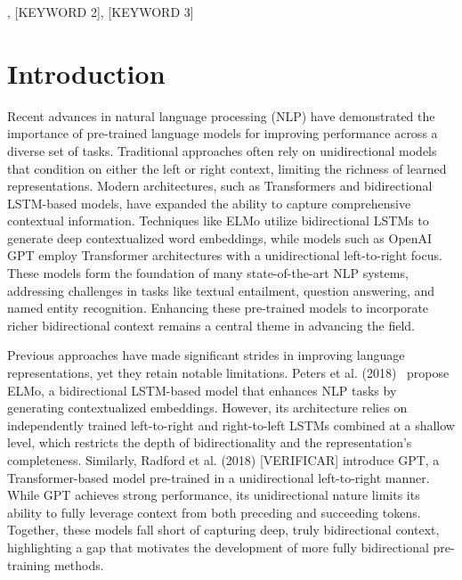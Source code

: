 \documentclass[journal]{IEEEtran}
\begin{document}
\begin{IEEEkeywords}
[KEYWORD 1], [KEYWORD 2], [KEYWORD 3]
\end{IEEEkeywords}

\IEEEpeerreviewmaketitle


\section{Introduction}

Recent advances in natural language processing (NLP) have demonstrated the importance of pre-trained language models for improving performance across a diverse set of tasks. Traditional approaches often rely on unidirectional models that condition on either the left or right context, limiting the richness of learned representations. Modern architectures, such as Transformers and bidirectional LSTM-based models, have expanded the ability to capture comprehensive contextual information. Techniques like ELMo utilize bidirectional LSTMs to generate deep contextualized word embeddings, while models such as OpenAI GPT employ Transformer architectures with a unidirectional left-to-right focus. These models form the foundation of many state-of-the-art NLP systems, addressing challenges in tasks like textual entailment, question answering, and named entity recognition. Enhancing these pre-trained models to incorporate richer bidirectional context remains a central theme in advancing the field.

Previous approaches have made significant strides in improving language representations, yet they retain notable limitations. Peters et al. (2018)~\cite{peters2018elmo} propose ELMo, a bidirectional LSTM-based model that enhances NLP tasks by generating contextualized embeddings. However, its architecture relies on independently trained left-to-right and right-to-left LSTMs combined at a shallow level, which restricts the depth of bidirectionality and the representation’s completeness. Similarly, Radford et al. (2018) [VERIFICAR] introduce GPT, a Transformer-based model pre-trained in a unidirectional left-to-right manner. While GPT achieves strong performance, its unidirectional nature limits its ability to fully leverage context from both preceding and succeeding tokens. Together, these models fall short of capturing deep, truly bidirectional context, highlighting a gap that motivates the development of more fully bidirectional pre-training methods.
\end{document}

